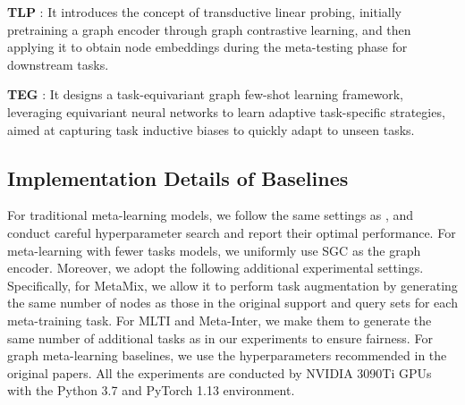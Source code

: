 \noindent \textbf{TLP} \cite{tan2022transductive}: It introduces the concept of transductive linear probing, initially pretraining a graph encoder through graph contrastive learning, and then applying it to obtain node embeddings during the meta-testing phase for downstream tasks. 

\noindent \textbf{TEG} \cite{kim2023task}: It designs a task-equivariant graph few-shot learning framework, leveraging equivariant neural networks to learn adaptive task-specific strategies, aimed at capturing task inductive biases to quickly adapt to unseen tasks.

\subsection{Implementation Details of Baselines}
For traditional meta-learning models, we follow the same settings as \cite{ding2020graph, liu2022few}, and conduct careful hyperparameter search and report their optimal performance. For meta-learning with fewer tasks models, we uniformly use SGC as the graph encoder. Moreover, we adopt the following additional experimental settings. Specifically, for MetaMix, we allow it to perform task augmentation by generating the same number of nodes as those in the original support and query sets for each meta-training task. For MLTI and Meta-Inter, we make them to generate the same number of additional tasks as in our experiments to ensure fairness. For graph meta-learning baselines, we use the hyperparameters recommended in the original papers. All the experiments are conducted by NVIDIA 3090Ti GPUs with the Python 3.7 and PyTorch 1.13 environment.


